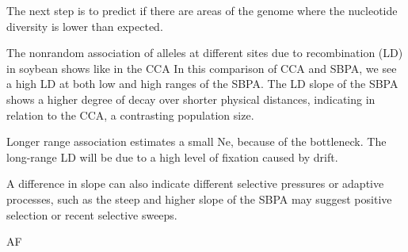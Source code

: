 \documentclass[9pt, twocolumn,twoside]{gsajnl}
\begin{document}
The next step is to predict if there are areas of the genome where the nucleotide diversity is lower than expected. 


The nonrandom association of alleles at different sites due to recombination (LD) in soybean shows like in the CCA
In this comparison of CCA and SBPA, we see a high LD at both low and high ranges of the SBPA. The LD slope of the SBPA shows a higher degree of decay over shorter physical distances, indicating in relation to the CCA, a contrasting population size. 

Longer range association estimates a small Ne, because of the bottleneck. 
The long-range LD will be due to a high level of fixation caused by drift.   

 

A difference in slope can also indicate different selective pressures or adaptive processes, such as the steep and higher slope of the SBPA may suggest positive selection or recent selective sweeps. 

AF 
\end{document}
